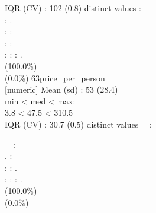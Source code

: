 \documentclass[
  journal,
]{IEEEtran}%
\begin{document}
IQR (CV) : 102 (0.8)  distinct values \textbar{} \textbar:\\
: .\\
: :\\
: :\\
: : : . \\
(100.0\%) \\
(0.0\%) \textbar{} \textbar{} 63\textbar price\_per\_person\\
{[}numeric{]} \textbar Mean (sd) : 53 (28.4)\\
min \textless{} med \textless{} max:\\
3.8 \textless{} 47.5 \textless{} 310.5\\
IQR (CV) : 30.7 (0.5)  distinct values \textbar{}
\textbar~~:\\
\strut ~~:\\
. :\\
: : .\\
: : : . \\
(100.0\%) \\
(0.0\%) \textbar{}
\end{document}
